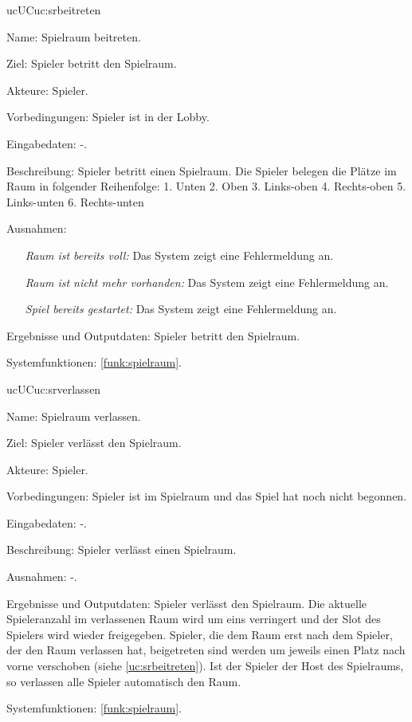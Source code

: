 \begin{description}[leftmargin=5em, style=sameline]
	\begin{lhp}{uc}{UC}{uc:srbeitreten} %
		\item [Name:] Spielraum beitreten.
		\item [Ziel:] Spieler betritt den Spielraum.
		\item [Akteure:] Spieler.
		\item [Vorbedingungen:] Spieler ist in der Lobby.
		\item [Eingabedaten:] -.
		\item [Beschreibung:] Spieler betritt einen Spielraum. Die Spieler belegen die Plätze im Raum in folgender Reihenfolge: 1. Unten 2. Oben 3. Links-oben 4. Rechts-oben 5. Links-unten 6. Rechts-unten
		\item [Ausnahmen:] \hfill
		\begin{itemize} 
				\item[] \textit{Raum ist bereits voll:} Das System zeigt eine Fehlermeldung an.
				\item[] \textit{Raum ist nicht mehr vorhanden:} Das System zeigt eine Fehlermeldung an.
				\item[] \textit{Spiel bereits gestartet:} Das System zeigt eine Fehlermeldung an.
			\end{itemize}
		\item [Ergebnisse und Outputdaten:] Spieler betritt den Spielraum.	
		\item [Systemfunktionen:] \ref{funk:spielraum}. %
	\end{lhp}
	
	\begin{lhp}{uc}{UC}{uc:srverlassen} %
		\item [Name:] Spielraum verlassen.
		\item [Ziel:] Spieler verlässt den Spielraum.
		\item [Akteure:] Spieler.
		\item [Vorbedingungen:] Spieler ist im Spielraum und das Spiel hat noch nicht begonnen.
		\item [Eingabedaten:] -.
		\item [Beschreibung:] Spieler verlässt einen Spielraum.
		\item [Ausnahmen:]
        -.
		\item [Ergebnisse und Outputdaten:] Spieler verlässt den Spielraum.	Die aktuelle Spieleranzahl im verlassenen Raum wird um eins verringert und der Slot des Spielers wird wieder freigegeben. Spieler, die dem Raum erst nach dem Spieler, der den Raum verlassen hat, beigetreten sind werden um jeweils einen Platz nach vorne verschoben (siehe \ref{uc:srbeitreten}). Ist der Spieler der Host des Spielraums, so verlassen alle Spieler automatisch den Raum.
		\item [Systemfunktionen:] \ref{funk:spielraum}. %
	\end{lhp}
	

\end{description}
